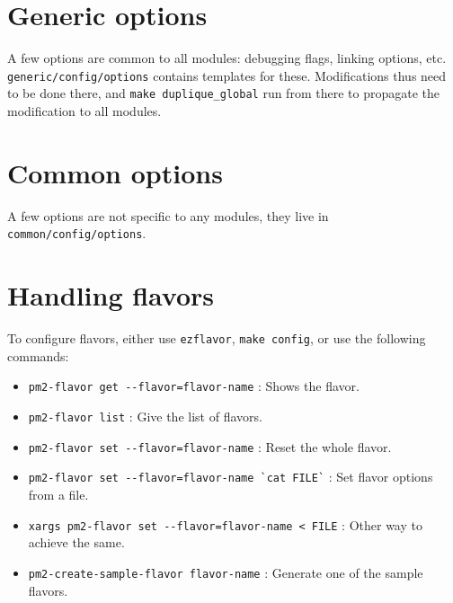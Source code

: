 \documentclass[11pt, a4paper ,twoside]{article}
\begin{document}
\section{Generic options}

A few options are common to all modules: debugging flags, linking
options, etc. \verb+generic/config/options+ contains templates for
these.  Modifications thus need to be done there, and
\verb+make duplique_global+ run from there to propagate the modification
to all modules.

\section{Common options}

A few options are not specific to any modules, they live in
\verb+common/config/options+.

\section{Handling flavors}

To configure flavors, either use \verb+ezflavor+, \verb+make config+, or
use the following commands:
\begin{itemize}
\item \verb|pm2-flavor get --flavor=flavor-name| : Shows the
flavor.
\item \verb|pm2-flavor list| : Give the list of flavors.
\item \verb|pm2-flavor set --flavor=flavor-name| : Reset the whole
flavor.
\item \verb|pm2-flavor set --flavor=flavor-name `cat FILE`| : Set
flavor options from a file.
\item \verb|xargs pm2-flavor set --flavor=flavor-name < FILE| : Other
way to achieve the same.
\item \verb|pm2-create-sample-flavor flavor-name| : Generate one of the
sample flavors.
\end{itemize}
\end{document}
